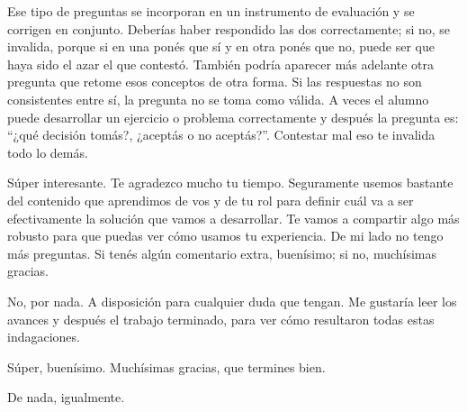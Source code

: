 \begin{description}[leftmargin=0cm, labelsep=0.5cm, style=nextline]
Ese tipo de preguntas se incorporan en un instrumento de evaluación y se corrigen en conjunto. Deberías haber respondido las dos correctamente; si no, se invalida, porque si en una ponés que sí y en otra ponés que no, puede ser que haya sido el azar el que contestó.
También podría aparecer más adelante otra pregunta que retome esos conceptos de otra forma. Si las respuestas no son consistentes entre sí, la pregunta no se toma como válida. A veces el alumno puede desarrollar un ejercicio o problema correctamente y después la pregunta es: ``¿qué decisión tomás?, ¿aceptás o no aceptás?''. Contestar mal eso te invalida todo lo demás.
\item[\textbf{Entrevistadores:}] Súper interesante. Te agradezco mucho tu tiempo. Seguramente usemos bastante del contenido que aprendimos de vos y de tu rol para definir cuál va a ser efectivamente la solución que vamos a desarrollar. Te vamos a compartir algo más robusto para que puedas ver cómo usamos tu experiencia. De mi lado no tengo más preguntas. Si tenés algún comentario extra, buenísimo; si no, muchísimas gracias.
\item[\textbf{Entrevistada:}] No, por nada. A disposición para cualquier duda que tengan. Me gustaría leer los avances y después el trabajo terminado, para ver cómo resultaron todas estas indagaciones.
\item[\textbf{Entrevistadores:}] Súper, buenísimo. Muchísimas gracias, que termines bien.
\item[\textbf{Entrevistada:}] De nada, igualmente.
\end{description}
